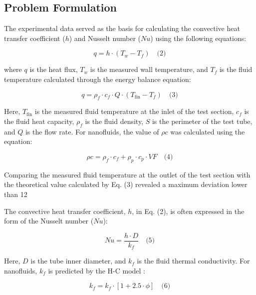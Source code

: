\documentclass{article}
\begin{document}

\subsection{Problem Formulation}
The experimental data served as the basis for calculating the convective heat transfer coefficient ($h$) and Nusselt number ($Nu$) using the following equations:

\begin{equation}
q = h \cdot (T_w - T_f) \quad \text{(2)}
\end{equation}

where $q$ is the heat flux, $T_w$ is the measured wall temperature, and $T_f$ is the fluid temperature calculated through the energy balance equation:

\begin{equation}
q = \rho_f \cdot c_f \cdot Q \cdot (T_{\text{fin}} - T_f) \quad \text{(3)}
\end{equation}

Here, $T_{\text{fin}}$ is the measured fluid temperature at the inlet of the test section, $c_f$ is the fluid heat capacity, $\rho_f$ is the fluid density, $S$ is the perimeter of the test tube, and $Q$ is the flow rate. For nanofluids, the value of $\rho c$ was calculated using the equation:

\begin{equation}
\rho c = \rho_f \cdot c_f + \rho_p \cdot c_p \cdot VF \quad \text{(4)}
\end{equation}

Comparing the measured fluid temperature at the outlet of the test section with the theoretical value calculated by Eq. (3) revealed a maximum deviation lower than 12%

The convective heat transfer coefficient, $h$, in Eq. (2), is often expressed in the form of the Nusselt number ($Nu$):

\begin{equation}
Nu = \frac{h \cdot D}{k_f} \quad \text{(5)}
\end{equation}

Here, $D$ is the tube inner diameter, and $k_f$ is the fluid thermal conductivity. For nanofluids, $k_f$ is predicted by the H-C model \cite{ref8}:

\begin{equation}
k_f = k_f \cdot [1 + 2.5 \cdot \phi] \quad \text{(6)}
\end{equation}
\end{document}
